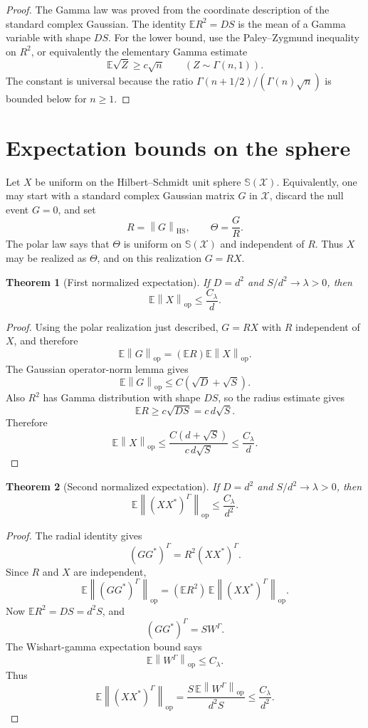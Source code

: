 \documentclass[11pt,oneside]{book}
\newtheorem{theorem}{Theorem}[chapter]
\newcommand{\E}{\mathbb E}
\newcommand{\1}{\mathbf 1}
\newcommand{\GammaPT}{\Gamma}
\newcommand{\HS}{\mathrm{HS}}
\newcommand{\op}{\mathrm{op}}
\newcommand{\sphere}{\mathbb S}
\newcommand{\norm}[1]{\left\|#1\right\|}
\begin{document}
\begin{proof}
The Gamma law was proved from the coordinate description of the standard
complex Gaussian.  The identity \(\E R^2=DS\) is the mean of a Gamma variable
with shape \(DS\).  For the lower bound, use the Paley--Zygmund inequality on
\(R^2\), or equivalently the elementary Gamma estimate
\[
  \E\sqrt Z\ge c\sqrt n
  \qquad
  (Z\sim\Gamma(n,1)).
\]
The constant is universal because the ratio
\(\Gamma(n+1/2)/(\Gamma(n)\sqrt n)\) is bounded below for \(n\ge1\).
\end{proof}

\section{Expectation bounds on the sphere}

Let \(X\) be uniform on the Hilbert--Schmidt unit sphere
\(\sphere(\mathcal X)\).  Equivalently, one may start with a standard complex
Gaussian matrix \(G\) in \(\mathcal X\), discard the null event \(G=0\), and
set
\[
  R=\norm G_{\HS},\qquad \Theta=\frac{G}{R}.
\]
The polar law says that \(\Theta\) is uniform on \(\sphere(\mathcal X)\) and
independent of \(R\).  Thus \(X\) may be realized as \(\Theta\), and on this
realization \(G=RX\).

\begin{theorem}[First normalized expectation]
If \(D=d^2\) and \(S/d^2\to\lambda>0\), then
\[
  \E\norm X_{\op}\le \frac{C_\lambda}{d}.
\]
\end{theorem}

\begin{proof}
Using the polar realization just described, \(G=RX\) with \(R\) independent
of \(X\), and therefore
\[
  \E\norm G_{\op}=(\E R)\E\norm X_{\op}.
\]
The Gaussian operator-norm lemma gives
\[
  \E\norm G_{\op}\le C(\sqrt D+\sqrt S).
\]
Also \(R^2\) has Gamma distribution with shape \(DS\), so the radius estimate
gives
\[
  \E R\ge c\sqrt{DS}=c\,d\sqrt S.
\]
Therefore
\[
  \E\norm X_{\op}
  \le
  \frac{C(d+\sqrt S)}{c\,d\sqrt S}
  \le
  \frac{C_\lambda}{d}.
\]
\end{proof}

\begin{theorem}[Second normalized expectation]
If \(D=d^2\) and \(S/d^2\to\lambda>0\), then
\[
  \E\norm{(XX^*)^{\GammaPT}}_{\op}
  \le
  \frac{C_\lambda}{d^2}.
\]
\end{theorem}

\begin{proof}
The radial identity gives
\[
  (GG^*)^{\GammaPT}
  =
  R^2(XX^*)^{\GammaPT}.
\]
Since \(R\) and \(X\) are independent,
\[
  \E\norm{(GG^*)^{\GammaPT}}_{\op}
  =
  (\E R^2)\,
  \E\norm{(XX^*)^{\GammaPT}}_{\op}.
\]
Now \(\E R^2=DS=d^2S\), and
\[
  (GG^*)^{\GammaPT}=S W^{\GammaPT}.
\]
The Wishart-gamma expectation bound says
\[
  \E\norm{W^{\GammaPT}}_{\op}\le C_\lambda.
\]
Thus
\[
  \E\norm{(XX^*)^{\GammaPT}}_{\op}
  =
  \frac{S\,\E\norm{W^{\GammaPT}}_{\op}}{d^2S}
  \le
  \frac{C_\lambda}{d^2}.
\]
\end{proof}
\end{document}
